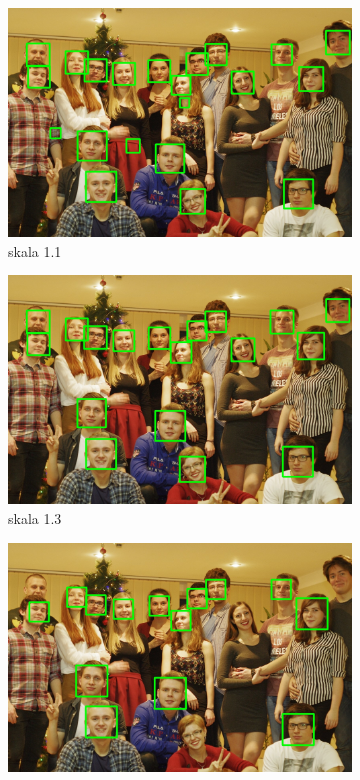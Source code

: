 \documentclass{article}
\numberwithin{equation}{section}
\begin{document}
\begin{figure}[H]
    \centering
        \begin{subfigure}{0.32\textwidth}
        \centering
        \includegraphics[width=\linewidth]{twarze11.jpg}
        \caption{skala 1.1}
        \label{fig:twarzSkala11}
    \end{subfigure}\hfill
    \begin{subfigure}{0.32\textwidth}
        \centering
        \includegraphics[width=\linewidth]{twarze13.jpg}
        \caption{skala 1.3}
        \label{fig:twarzSkala13}
    \end{subfigure}\hfill
    \begin{subfigure}{0.32\textwidth}
        \centering
        \includegraphics[width=\linewidth]{twarze16.jpg}

\end{subfigure}
\end{figure}
\end{document}
